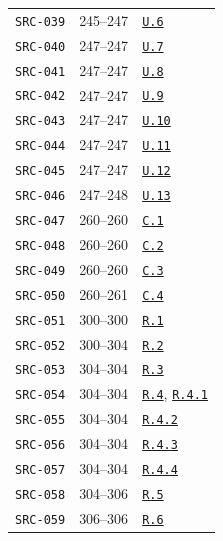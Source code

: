 \documentclass[12pt,letterpaper]{article}
\newcommand{\stepref}[1]{\hyperref[step:#1]{\texttt{#1}}}
\begin{document}
\begin{longtable}{p{.19\linewidth}p{.22\linewidth}p{.48\linewidth}}
\texttt{SRC-039} & 245--247 & \stepref{U.6} \\

\texttt{SRC-040} & 247--247 & \stepref{U.7} \\

\texttt{SRC-041} & 247--247 & \stepref{U.8} \\

\texttt{SRC-042} & 247--247 & \stepref{U.9} \\

\texttt{SRC-043} & 247--247 & \stepref{U.10} \\

\texttt{SRC-044} & 247--247 & \stepref{U.11} \\

\texttt{SRC-045} & 247--247 & \stepref{U.12} \\

\texttt{SRC-046} & 247--248 & \stepref{U.13} \\

\texttt{SRC-047} & 260--260 & \stepref{C.1} \\

\texttt{SRC-048} & 260--260 & \stepref{C.2} \\

\texttt{SRC-049} & 260--260 & \stepref{C.3} \\

\texttt{SRC-050} & 260--261 & \stepref{C.4} \\

\texttt{SRC-051} & 300--300 & \stepref{R.1} \\

\texttt{SRC-052} & 300--304 & \stepref{R.2} \\

\texttt{SRC-053} & 304--304 & \stepref{R.3} \\

\texttt{SRC-054} & 304--304 & \stepref{R.4}, \stepref{R.4.1} \\

\texttt{SRC-055} & 304--304 & \stepref{R.4.2} \\

\texttt{SRC-056} & 304--304 & \stepref{R.4.3} \\

\texttt{SRC-057} & 304--304 & \stepref{R.4.4} \\

\texttt{SRC-058} & 304--306 & \stepref{R.5} \\

\texttt{SRC-059} & 306--306 & \stepref{R.6} \\


\end{longtable}
\end{document}
